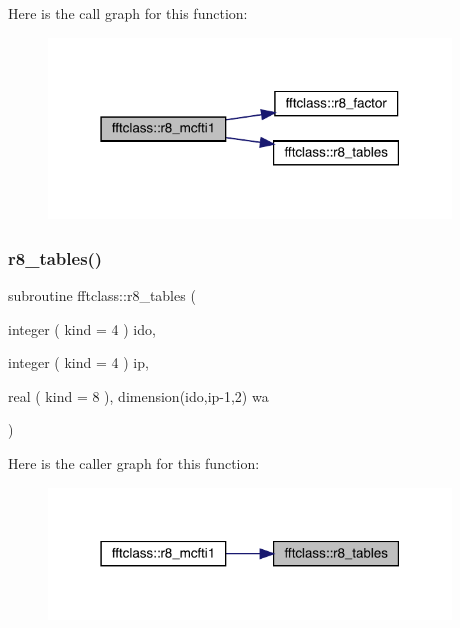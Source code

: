 Here is the call graph for this function\+:\nopagebreak
\begin{figure}[H]
\begin{center}
\leavevmode
\includegraphics[width=303pt]{namespacefftclass_a89d64713ecbaec08b4d5180fcbc56cea_cgraph}
\end{center}
\end{figure}
\mbox{\label{namespacefftclass_a68ac2e6dba058989d5e0d7fbee9aa19f}} 
\subsubsection{\texorpdfstring{r8\_tables()}{r8\_tables()}}
{\footnotesize\ttfamily subroutine fftclass\+::r8\+\_\+tables (\begin{DoxyParamCaption}\item[{integer ( kind = 4 )}]{ido,  }\item[{integer ( kind = 4 )}]{ip,  }\item[{real ( kind = 8 ), dimension(ido,ip-\/1,2)}]{wa }\end{DoxyParamCaption})}

Here is the caller graph for this function\+:\nopagebreak
\begin{figure}[H]
\begin{center}
\leavevmode
\includegraphics[width=303pt]{namespacefftclass_a68ac2e6dba058989d5e0d7fbee9aa19f_icgraph}
\end{center}
\end{figure}
\mbox{\label{namespacefftclass_a1aec6e8023ec23ff926a64c54c93ee1e}} 
